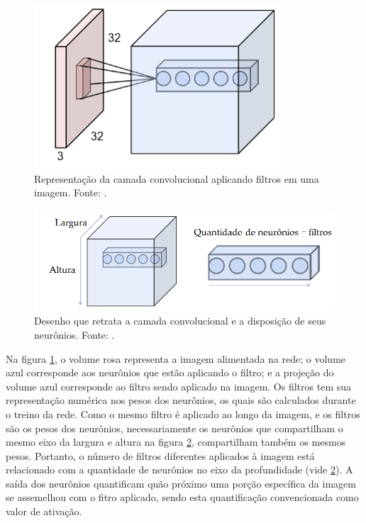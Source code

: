 \documentclass[
	12pt,				%
	oneside,			%
	a4paper,			%
	english,			%
	french,				%
	spanish,			%
	brazil,				%
	]{abntex2}
\begin{document}
\begin{figure}[H]
	\centering
	\includegraphics[width=.4\textwidth]{imagens/camadaconvolucional}
	\caption{Representação da camada convolucional aplicando filtros em uma imagem. Fonte: \cite{ref3}.}
	\label{camadaconvolucional}
\end{figure} 

\begin{figure}[H]
	\centering
	\includegraphics[width=.8\textwidth]{imagens/camadaconvolucional2}
	\caption{Desenho que retrata a camada convolucional e a disposição de seus neurônios. Fonte: \cite{ref3}.}
	\label{camadaconvolucional2}
\end{figure} 

Na figura \ref{camadaconvolucional}, o volume rosa representa a imagem alimentada na rede; o volume azul corresponde aos neurônios que estão aplicando o filtro; e a projeção do volume azul corresponde ao filtro sendo aplicado na imagem. Os filtros tem sua representação numérica nos pesos dos neurônios, os quais são calculados durante o treino da rede. Como o mesmo filtro é aplicado ao longo da imagem, e os filtros são os pesos dos neurônios, necessariamente os neurônios que compartilham o mesmo eixo da largura e altura na figura \ref{camadaconvolucional2}, compartilham também os mesmos pesos. Portanto, o número de filtros diferentes aplicados à imagem está relacionado com a quantidade de neurônios no eixo da profundidade (vide \ref{camadaconvolucional2}). A saída dos neurônios quantificam quão próximo uma porção específica da imagem se assemelhou com o fitro aplicado, sendo esta quantificação convencionada como valor de ativação.
\end{document}
